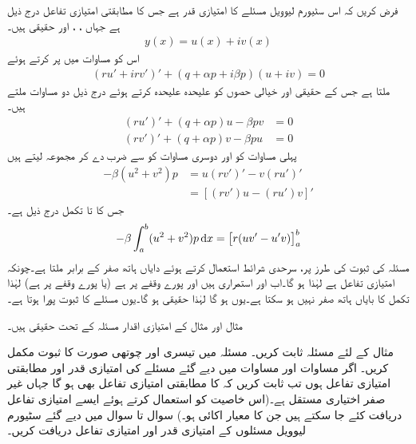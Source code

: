 فرض کریں کہ اس سٹیورم لیوویل مسئلے کا   امتیازی قدر ہے جس کا مطابقتی امتیازی تفاعل درج ذیل ہے جہاں ، ،  اور  حقیقی ہیں۔
\begin{align}
y(x)=u(x)+iv(x)
\end{align} 
اس کو مساوات  میں پر کرتے ہوئے
\begin{align*}
(ru'+irv')'+(q+\alpha p+i\beta p)(u+iv)=0
\end{align*}
ملتا ہے جس کے حقیقی اور  خیالی حصوں کو علیحدہ علیحدہ کرتے ہوئے درج ذیل دو مساوات ملتے ہیں۔
\begin{align*}
(ru')'+(q+\alpha p)u-\beta p v&=0\\
(rv')'+(q+\alpha p)v-\beta p u&=0
\end{align*}
پہلی مساوات کو  اور دوسری مساوات کو  سے ضرب دے کر مجموعہ لیتے ہیں
\begin{align*}
-\beta(u^2+v^2)p&=u(rv')'-v(ru')'\\
&=[(rv')u-(ru')v]'
\end{align*}
جس کا  تا  تکمل درج ذیل ہے۔
\begin{align*}
-\beta \int_a^b (u^2+v^2)p\dif x=\left[r(uv'-u'v)\right]_a^b
\end{align*}
مسئلہ  کی ثبوت کی طرز پر، سرحدی شرائط استعمال کرتے ہوئے دایاں ہاتھ صفر کے برابر ملتا ہے۔چونکہ  امتیازی تفاعل ہے لہٰذا  ہو گا۔اب  اور  استمراری ہیں اور پورے وقفے پر   ہے (یا پورے وقفے پر   ہے) لہٰذا تکمل کا بایاں ہاتھ صفر نہیں ہو سکتا ہے۔یوں  ہو گا لہٰذا   حقیقی ہو گا۔یوں مسئلے کا ثبوت پورا ہوتا ہے۔

مثال  اور مثال  کے امتیازی اقدار مسئلہ  کے تحت حقیقی ہیں۔


مثال  کے لئے مسئلہ   ثابت کریں۔
مسئلہ   میں تیسری اور چوتھی صورت  کا ثبوت مکمل کریں۔
اگر مساوات  اور مساوات  میں دیے گئے مسئلے کی امتیازی قدر  اور مطابقتی امتیازی تفاعل  ہوں تب ثابت کریں کہ  کا مطابقتی امتیازی تفاعل  بھی ہو گا جہاں  غیر صفر اختیاری مستقل ہے۔(اس خاصیت کو استعمال کرتے ہوئے ایسے امتیازی تفاعل دریافت کئے جا سکتے ہیں جن کا معیار اکائی ہو۔)
سوال  تا سوال  میں دیے گئے سٹیورم لیوویل مسئلوں کے امتیازی قدر اور امتیازی تفاعل دریافت کریں۔

